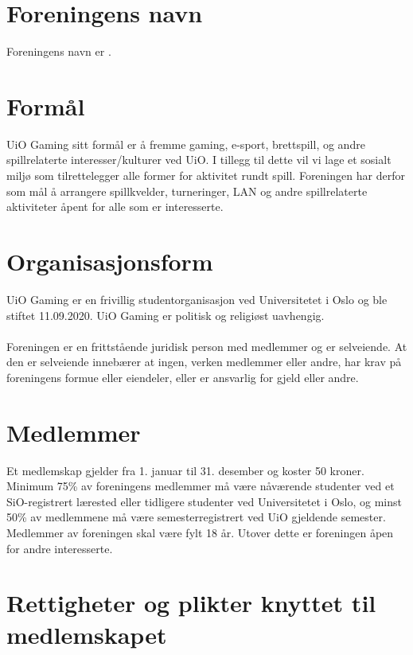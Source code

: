\documentclass[12pt,a4paper,norsk]{article}
\begin{document}
\section{Foreningens navn}
Foreningens navn er .


\section{Formål}

UiO Gaming sitt formål er å fremme gaming, e-sport, brettspill, og andre spillrelaterte
interesser/kulturer ved UiO. I tillegg til dette vil vi lage et sosialt miljø som tilrettelegger alle
former for aktivitet rundt spill. Foreningen har derfor som mål å arrangere spillkvelder,
turneringer, LAN og andre spillrelaterte aktiviteter åpent for alle som er interesserte.



\section{Organisasjonsform}

UiO Gaming er en frivillig studentorganisasjon ved Universitetet i Oslo og ble stiftet
11.09.2020. UiO Gaming er politisk og religiøst uavhengig.
\\
\\
Foreningen er en frittstående juridisk person med medlemmer og er selveiende. At den er
selveiende innebærer at ingen, verken medlemmer eller andre, har krav på foreningens formue
eller eiendeler, eller er ansvarlig for gjeld eller andre.



\section{Medlemmer}

Et medlemskap gjelder fra 1. januar til 31. desember og koster 50 kroner. Minimum 75\% av
foreningens medlemmer må være nåværende studenter ved et SiO-registrert lærested eller
tidligere studenter ved Universitetet i Oslo, og minst 50\% av medlemmene må være
semesterregistrert ved UiO gjeldende semester. Medlemmer av foreningen skal være fylt 18 år. Utover dette er foreningen åpen for andre
interesserte.



\section{Rettigheter og plikter knyttet til medlemskapet}
\end{document}
